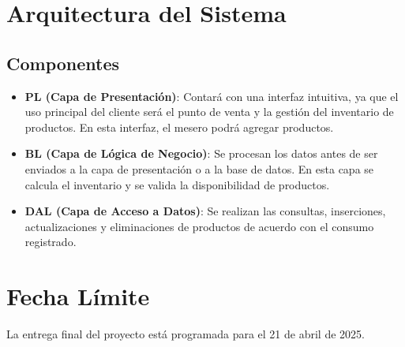 \documentclass{article}
\begin{document}
\section{Arquitectura del Sistema}
\subsection{Componentes}
\begin{itemize}
\item \textbf{PL (Capa de Presentación)}: Contará con una interfaz intuitiva, ya que el uso principal del cliente será el punto de venta y la gestión del inventario de productos. En esta interfaz, el mesero podrá agregar productos.
\item \textbf{BL (Capa de Lógica de Negocio)}: Se procesan los datos antes de ser enviados a la capa de presentación o a la base de datos. En esta capa se calcula el inventario y se valida la disponibilidad de productos.
\item \textbf{DAL (Capa de Acceso a Datos)}: Se realizan las consultas, inserciones, actualizaciones y eliminaciones de productos de acuerdo con el consumo registrado.
\end{itemize}

\section{Fecha Límite}
La entrega final del proyecto está programada para el 21 de abril de 2025.
\end{document}
